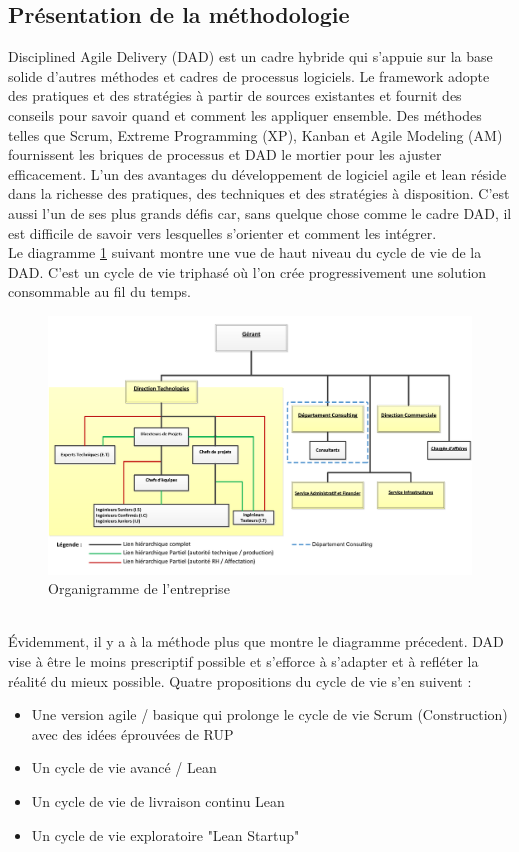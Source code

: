 \begin{spacing}{1.5}
\subsection{Présentation de la méthodologie}
Disciplined Agile Delivery (DAD) est un cadre hybride qui s'appuie sur la base solide d'autres méthodes et cadres de processus logiciels. Le framework adopte des pratiques et des stratégies à partir de sources existantes et fournit des conseils pour savoir quand et comment les appliquer ensemble. Des méthodes telles que Scrum, Extreme Programming (XP), Kanban et Agile Modeling (AM) fournissent les briques de processus et DAD le mortier pour les ajuster efficacement. L'un des avantages du développement de logiciel agile et lean réside dans la richesse des pratiques, des techniques et des stratégies à disposition. C'est aussi l'un de ses plus grands défis car, sans quelque chose comme le cadre DAD, il est difficile de savoir vers lesquelles s'orienter et comment les intégrer.\\
Le diagramme \ref{fig:triphase} suivant montre une vue de haut niveau du cycle de vie de la DAD. C'est un cycle de vie triphasé où l'on crée progressivement une solution consommable au fil du temps.\\

\begin{figure}[h]
\centering
\includegraphics[scale=0.8]{organigramme.png}
\caption{Organigramme de l'entreprise}
\label{fig:triphase}
\end{figure}
\\
Évidemment, il y a à la méthode plus que montre le diagramme précedent. DAD vise à être le moins prescriptif possible et s'efforce à s'adapter et à refléter la réalité du mieux possible. Quatre propositions du cycle de vie s'en suivent :
\begin{itemize}
    \item Une version agile / basique qui prolonge le cycle de vie Scrum (Construction) avec des idées éprouvées de RUP
    \item Un cycle de vie avancé / Lean
    \item Un cycle de vie de livraison continu Lean
    \item Un cycle de vie exploratoire "Lean Startup"
\end{itemize}\\


\end{spacing}
